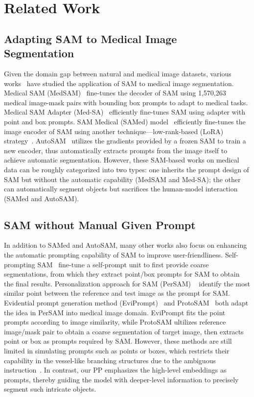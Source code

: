\section{Related Work}
\label{sec:related}

\subsection{Adapting SAM to Medical Image Segmentation}
 Given the domain gap between natural and medical image datasets, various works~\cite{ma2024segment, wu2023medical, zhang2023customized, shaharabany2023autosam} have studied the application of SAM to medical image segmentation.  Medical SAM (MedSAM)~\cite{ma2024segment} fine-tunes the decoder of SAM using 1,570,263 medical image-mask pairs with bounding box prompts to adapt to medical tasks. Medical SAM Adapter (Med-SA)~\cite{wu2023medical} efficiently fine-tunes SAM using adapter with point and box prompts. SAM Medical (SAMed) model~\cite{zhang2023customized} efficiently fine-tunes the image encoder of SAM using another technique---low-rank-based (LoRA) strategy~\cite{hu2021lora}. AutoSAM~\cite{shaharabany2023autosam} utilizes the gradients provided by a frozen SAM to train a new encoder, thus automatically extracts prompts from the image itself to achieve automatic segmentation. However, these SAM-based works on medical data can be roughly categorized into two types: one inherits the prompt design of SAM but without the automatic capability (MedSAM and Med-SA); the other can automatically segment objects but sacrifices the human-model interaction (SAMed and AutoSAM).

\subsection{SAM without Manual Given Prompt}
In addition to SAMed and AutoSAM, many other works also focus on enhancing the automatic prompting capability of SAM to improve user-friendliness. Self-prompting SAM~\cite{wu2023self} fine-tune a self-prompt unit to first provide coarse segmentations, from which they extract point/box prompts for SAM to obtain the final results. Personalization approach for SAM (PerSAM) ~\cite{zhang2023personalize} identify the most similar point between the reference and test image as the prompt for SAM. Evidential prompt generation method (EviPrompt)~\cite{xu2023eviprompt} and ProtoSAM~\cite{Ayzenberg2024ProtoSAMOM} both adapt the idea in PerSAM into medical image domain. EviPrompt fits the point prompts according to image similarity, while ProtoSAM ultilizes reference image/mask pair to obtain a coarse segmentation of target image, then extracts point or box as prompts required by SAM.
However, these methods are still limited in simulating prompts such as points or boxes, which restricts their capability in the vessel-like branching structures due to the ambiguous instruction~\cite{ma2024segment}. In contrast, our PP emphasizes the high-level embeddings as prompts, thereby guiding the model with deeper-level information to precisely segment such intricate objects.

